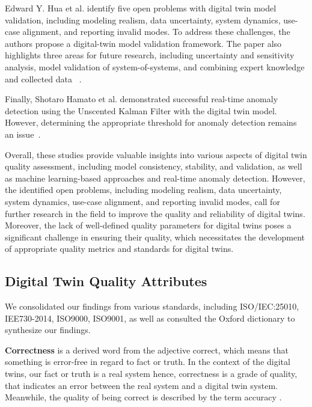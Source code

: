 \documentclass{llncs}
\begin{document}
    Edward Y. Hua et al. identify five open problems with digital twin model validation, including modeling realism, data uncertainty, system dynamics, use-case alignment, and reporting invalid modes. To address these challenges, the authors propose a digital-twin model validation framework. The paper also highlights three areas for future research, 
    including uncertainty and sensitivity analysis, model validation of system-of-systems, and combining expert knowledge and collected data ~\cite{ValidationofDigitalTwins}. 

    Finally, Shotaro Hamato et al.  demonstrated successful real-time anomaly detection using the Unscented Kalman Filter with the digital twin model. 
    However, determining the appropriate threshold for anomaly detection remains an issue~\cite{JapeneseKalmanFilterCorrectness}.

    Overall, these studies provide valuable insights into various aspects of digital twin quality assessment, 
    including model consistency, stability, and validation, as well as machine learning-based approaches and real-time anomaly detection. 
    However, the identified open problems, including modeling realism, data uncertainty, system dynamics, use-case alignment, and reporting invalid modes, 
    call for further research in the field to improve the quality and reliability of digital twins. Moreover, 
    the lack of well-defined quality parameters for digital twins poses a significant challenge in ensuring their quality,
    which necessitates the development of appropriate quality metrics and standards for digital twins.
    \subsection{Digital Twin Quality Attributes}
    We consolidated our findings from various standards, including ISO/IEC:25010, IEE730-2014, ISO9000, ISO9001, as well as consulted the  Oxford dictionary to synthesize our findings\cite{ISO9000,ISO90012015,ISO/IEC:25010,IEE730-2014,OxfordDictionary}.
    
    \textbf{Correctness} is a  derived word from the adjective correct, which means that something is error-free in regard to fact or truth. In the context of the digital twins, our fact or truth is a real system hence, correctness is a grade of quality, that indicates an error between the real system and a digital twin system.
    Meanwhile, the quality of being correct is described by the term accuracy \cite{OxfordDictionary}. 
    
\end{document}
